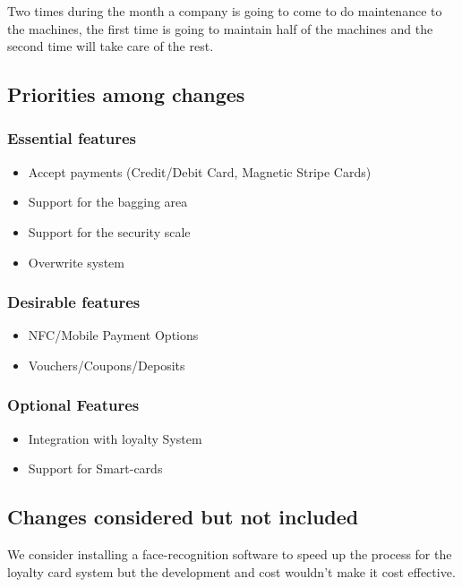 Two times during the month a company is going to come to do maintenance to the 
machines, the first time is going to maintain half of the machines and the 
second time will take care of the rest.  \newline


\subsection{Priorities among changes}

\subsubsection{Essential features}
\begin{itemize}
    \item Accept payments (Credit/Debit Card, Magnetic Stripe Cards)
    \item Support for the bagging area
    \item Support for the security scale
    \item Overwrite system
\end{itemize}

\subsubsection{Desirable features}
\begin{itemize}
	\item NFC/Mobile Payment Options
    \item Vouchers/Coupons/Deposits
\end{itemize}

\subsubsection{Optional Features}
\begin{itemize}
	\item Integration with loyalty System
    \item Support for Smart-cards
\end{itemize}


\subsection{Changes considered but not included}
We consider installing a face-recognition software to speed up the process 
for the loyalty card system but the development and cost wouldn’t make 
it cost effective.\newline

